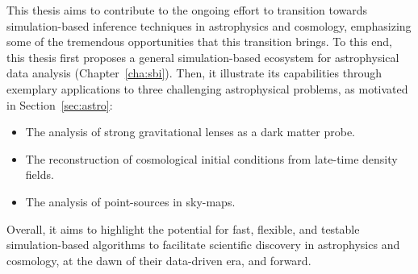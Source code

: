 This thesis aims to contribute to the ongoing effort to transition towards simulation-based inference techniques in astrophysics and cosmology, emphasizing some of the tremendous opportunities that this transition brings. To this end, this thesis first proposes a general simulation-based ecosystem for astrophysical data analysis (Chapter~\ref{cha:sbi}). Then, it illustrate its capabilities through exemplary applications to three challenging astrophysical problems, as motivated in Section~\ref{sec:astro}: 
\begin{itemize}[align=left, leftmargin=1cm]
	\item[{\makebox[3.2cm]{Chapters~\ref{cha:lensing} and \ref{cha:anre}: \hfill}}] The analysis of strong gravitational lenses as a dark matter {\makebox[2.45cm]{}} probe.
	\item[{\makebox[3.2cm]{Chapter~\ref{cha:cosmo}: \hfill}}] The reconstruction of cosmological initial conditions from late-{\makebox[2.45cm]{}}time density fields.
	\item[{\makebox[3.2cm]{Chapter~\ref{cha:detection}: \hfill}}] The analysis of point-sources in sky-maps. 
\end{itemize}
Overall, it aims to highlight the potential for fast, flexible, and testable simulation-based algorithms to facilitate scientific discovery in astrophysics and cosmology, at the dawn of their data-driven era, and forward.




